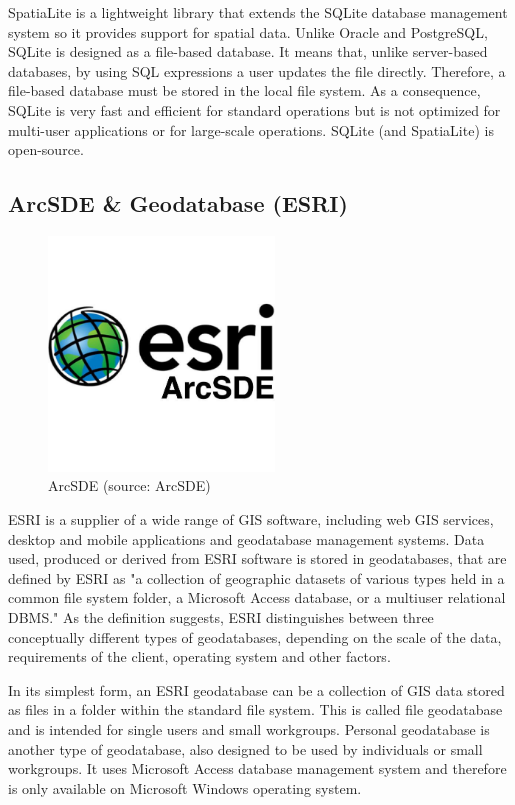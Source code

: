 SpatiaLite is a lightweight library that extends the SQLite database management system so it provides support for spatial data. Unlike Oracle and PostgreSQL, SQLite is designed as a file-based database. It means that, unlike server-based databases, by using SQL expressions a user updates the file directly. Therefore, a file-based database must be stored in the local file system. As a consequence, SQLite is very fast and efficient for standard operations but is not optimized for multi-user applications or for large-scale operations. SQLite (and SpatiaLite) is open-source.

\subsection{ArcSDE \& Geodatabase (ESRI)}

\begin{figure}[H] \centering
      \includegraphics[width=170pt]{./pictures/arcsde.png}
      \caption[ArcSDE logo]{ArcSDE (source: ArcSDE)}
      \label{fig:ArcSDE}
  \end{figure}
	
ESRI is a supplier of a wide range of GIS software, including web GIS services, desktop and mobile applications and geodatabase management systems. Data used, produced or derived from ESRI software is stored in geodatabases, that are defined by ESRI as "a collection of geographic datasets of various types held in a common file system folder, a Microsoft Access database, or a multiuser relational DBMS."\cite{esridef}  As the definition suggests, ESRI distinguishes between three conceptually different types of geodatabases, depending on the scale of the data, requirements of the client, operating system and other factors.

In its simplest form, an ESRI geodatabase can be a collection of GIS data stored as files in a folder within the standard file system. This is called file geodatabase and is intended for single users and small workgroups. Personal geodatabase is another type of geodatabase, also designed to be used by individuals or small workgroups. It uses Microsoft Access database management system and therefore is only available on Microsoft Windows operating system. 

